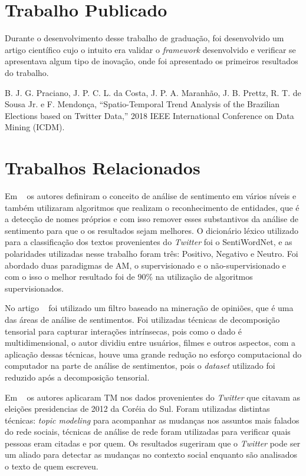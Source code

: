 \section{Trabalho Publicado}

Durante o desenvolvimento desse trabalho de graduação, foi desenvolvido um artigo científico cujo o intuito era validar o \textit{framework} desenvolvido
e verificar se apresentava
algum tipo de inovação, onde foi apresentado os primeiros resultados do trabalho. 


B. J. G. Praciano, J. P. C. L. da Costa, J. P. A. Maranhão, J. B. Prettz, R. T. de Sousa Jr. e F. Mendonça, “Spatio-Temporal Trend Analysis of the Brazilian Elections based on Twitter Data,”  2018 IEEE International Conference on Data Mining (ICDM).


\section{Trabalhos Relacionados}

Em ~\cite{8474783} os autores definiram o conceito de análise de sentimento em vários níveis e também utilizaram algoritmos que realizam o reconhecimento de entidades, que é
a detecção de nomes próprios e com isso remover esses substantivos da análise de sentimento para que o os resultados sejam melhores. O dicionário léxico utilizado para a classificação
dos textos provenientes do \textit{Twitter} foi o SentiWordNet, e as polaridades utilizadas nesse trabalho foram três: Positivo, Negativo e Neutro. Foi abordado duas paradigmas
de \acrshort{AM}, o supervisionado e o não-supervisionado e com o isso o melhor resultado foi de 90\% na utilização de algoritmos supervisionados.


No artigo ~\cite{6413737} foi utilizado um filtro baseado na mineração de opiniões, que é uma das áreas de análise de sentimentos. Foi utilizadas técnicas de decomposição 
tensorial para capturar interações intrínsecas, pois como o dado é multidimensional, o autor dividiu entre usuários, filmes e outros aspectos, com a aplicação dessas técnicas,
houve uma grande redução no esforço computacional do computador na parte de análise de sentimentos, pois o \textit{dataset} utilizado foi reduzido após a decomposição tensorial.


Em ~\cite{song2014analyzing} os autores aplicaram \acrshort{TM} nos dados provenientes do \textit{Twitter} que citavam as eleições presidencias de 2012 da Coréia do Sul. 
Foram utilizadas distintas técnicas: \textit{topic modeling} para acompanhar as mudanças nos assuntos mais falados do rede sociais, técnicas de análise de rede 
foram utilizadas para verificar quais pessoas eram citadas e por quem. Os resultados sugeriram que o \textit{Twitter} pode ser um aliado para detectar as mudanças no 
contexto social enquanto são analisados o texto de quem escreveu.

